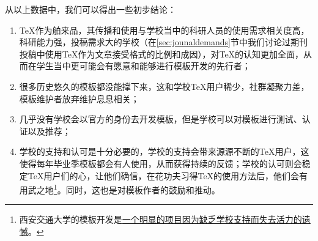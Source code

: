 从以上数据中，我们可以得出一些初步结论：
\begin{enumerate}
	\item \TeX 作为舶来品，其传播和使用与学校当中的科研人员的使用需求相关度高，科研能力强，投稿需求大的学校（在\ref{sec:jounaldemands}节中我们讨论过期刊投稿中使用\TeX 作为文章接受格式的比例和成因），对\TeX 的认知更加全面，从而在学生当中更可能会有愿意和能够进行模板开发的先行者；
	\item 很多历史悠久的模板都没能撑下来，这和学校\TeX 用户稀少，社群凝聚力差，模板维护者放弃维护息息相关；
	\item 几乎没有学校会以官方的身份去开发模板，但是学校可以对模板进行测试、认证以及推荐；
	\item 学校的支持和认可是十分必要的，学校的支持会带来源源不断的\TeX 用户，这使得每年毕业季模板都会有人使用，从而获得持续的反馈；学校的认可则会稳定\TeX 用户们的心，让他们确信，在花功夫习得\TeX 的使用方法后，他们会有用武之地\footnote{西安交通大学的模板开发是\href{https://code.google.com/archive/p/xjtuthesis/wikis/Letters.wiki}{一个明显的项目因为缺乏学校支持而失去活力的遗憾}。}。同时，这也是对模板作者的鼓励和推动。
\end{enumerate}

